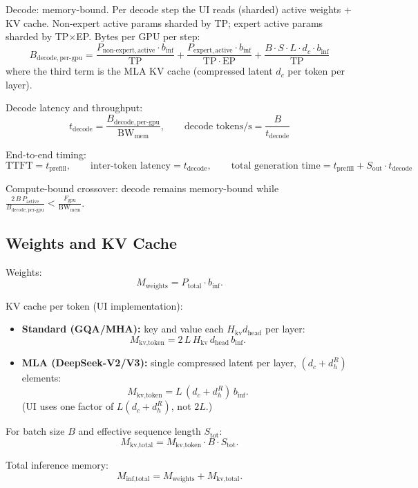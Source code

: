\documentclass[11pt]{article}
\begin{document}
Decode: memory-bound. Per decode step the UI reads (sharded) active weights + KV cache. Non-expert active params sharded by TP; expert active params sharded by TP$\times$EP. Bytes per GPU per step:
\[
B_{\mathrm{decode,per\text{-}gpu}} = \frac{P_{\mathrm{non\text{-}expert,active}} \cdot b_{\mathrm{inf}}}{\mathrm{TP}} + \frac{P_{\mathrm{expert,active}} \cdot b_{\mathrm{inf}}}{\mathrm{TP} \cdot \mathrm{EP}} + \frac{B \cdot S \cdot L \cdot d_c \cdot b_{\mathrm{inf}}}{\mathrm{TP}}
\]
where the third term is the MLA KV cache (compressed latent $d_c$ per token per layer).

Decode latency and throughput:
\[
t_{\mathrm{decode}} = \frac{B_{\mathrm{decode,per\text{-}gpu}}}{\mathrm{BW}_{\mathrm{mem}}}, \qquad \text{decode tokens/s} = \frac{B}{t_{\mathrm{decode}}}
\]

End-to-end timing:
\[
\mathrm{TTFT} = t_{\mathrm{prefill}}, \qquad \text{inter-token latency} = t_{\mathrm{decode}}, \qquad \text{total generation time} = t_{\mathrm{prefill}} + S_{\mathrm{out}} \cdot t_{\mathrm{decode}}
\]

Compute-bound crossover: decode remains memory-bound while $\displaystyle\frac{2 \, B \, P_{\mathrm{active}}}{B_{\mathrm{decode,per\text{-}gpu}}} < \frac{F_{\mathrm{gpu}}}{\mathrm{BW}_{\mathrm{mem}}}$.

\subsection{Weights and KV Cache}

Weights:
\[
M_{\text{weights}} = P_{\text{total}} \cdot b_{\text{inf}}.
\]

KV cache per token (UI implementation):
\begin{itemize}
  \item \textbf{Standard (GQA/MHA):} key and value each $H_{\text{kv}} d_{\text{head}}$ per layer:
  \[
  M_{\text{kv,token}} = 2 \, L \, H_{\text{kv}} \, d_{\text{head}} \, b_{\text{inf}}.
  \]
  \item \textbf{MLA (DeepSeek-V2/V3):} single compressed latent per layer, $(d_c + d^R_h)$ elements:
  \[
  M_{\text{kv,token}} = L \, (d_c + d^R_h) \, b_{\text{inf}}.
  \]
  (UI uses one factor of $L (d_c + d^R_h)$, not $2L$.)
\end{itemize}

For batch size $B$ and effective sequence length $S_{\text{tot}}$:
\[
M_{\text{kv,total}} = M_{\text{kv,token}} \cdot B \cdot S_{\text{tot}}.
\]

Total inference memory:
\[
M_{\text{inf,total}} =
M_{\text{weights}} + M_{\text{kv,total}}.
\]
\end{document}
